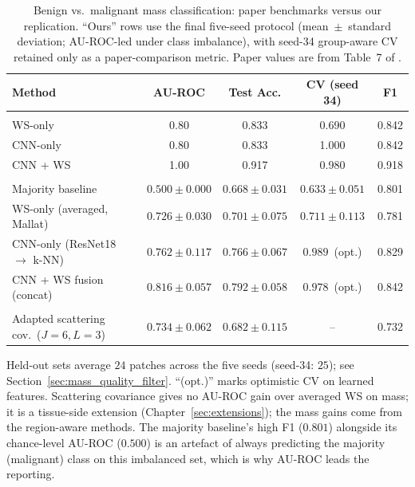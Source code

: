 \begin{table}[h]
\centering
\caption[Mass task: paper benchmarks versus our replication]{Benign vs.\ malignant mass classification: paper benchmarks versus our replication. ``Ours'' rows use the final five-seed protocol (mean~$\pm$~standard deviation; AU-ROC-led under class imbalance), with seed-34 group-aware CV retained only as a paper-comparison metric. Paper values are from Table~7 of \cite{razali2023cnn}.}
\label{tab:results_mass}
\begin{tabular}{>{\raggedright\arraybackslash}p{4.5cm}cccc}
\toprule
\textbf{Method} & \textbf{AU-ROC} & \textbf{Test Acc.} & \textbf{CV (seed 34)} & \textbf{F1} \\
\midrule
\multicolumn{5}{l}{\textit{Paper \cite{razali2023cnn} (single split)}} \\
\addlinespace
\quad WS-only            & 0.80 & 0.833 & 0.690 & 0.842 \\
\quad CNN-only           & 0.80 & 0.833 & 1.000 & 0.842 \\
\quad CNN + WS           & 1.00 & 0.917 & 0.980 & 0.918 \\
\midrule
\multicolumn{5}{l}{\textit{This replication: five-seed, post data-quality filter ($115$ patches)}} \\
\addlinespace
\quad Majority baseline                       & $0.500 \pm 0.000$ & $0.668 \pm 0.031$ & $0.633 \pm 0.051$ & 0.801 \\
\quad WS-only (averaged, Mallat)              & $0.726 \pm 0.030$ & $0.701 \pm 0.075$ & $0.711 \pm 0.113$ & 0.781 \\
\quad CNN-only (ResNet18 $\rightarrow$ k-NN)  & $0.762 \pm 0.117$ & $0.766 \pm 0.067$ & $0.989$~(opt.) & 0.829 \\
\quad CNN + WS fusion (concat)               & $0.816 \pm 0.057$ & $0.792 \pm 0.058$ & $0.978$~(opt.) & 0.842 \\
\midrule
\multicolumn{5}{l}{\textit{Extension (Chapter~\ref{sec:extensions})}} \\
\addlinespace
\quad Adapted scattering cov.\ ($J{=}6, L{=}3$) & $0.734 \pm 0.062$ & $0.682 \pm 0.115$ & -- & 0.732 \\
\bottomrule
\end{tabular}

\vspace{0.3em}
{\small Held-out sets average $24$ patches across the five seeds (seed-34: $25$); see Section~\ref{sec:mass_quality_filter}. ``(opt.)'' marks optimistic CV on learned features. Scattering covariance gives no AU-ROC gain over averaged WS on mass; it is a tissue-side extension (Chapter~\ref{sec:extensions}); the mass gains come from the region-aware methods. The majority baseline's high F1 ($0.801$) alongside its chance-level AU-ROC ($0.500$) is an artefact of always predicting the majority (malignant) class on this imbalanced set, which is why AU-ROC leads the reporting.}
\end{table}

